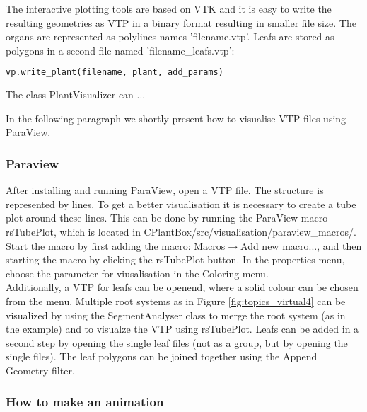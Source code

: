The interactive plotting tools are based on VTK and it is easy to write the resulting geometries as VTP in a binary format resulting in smaller file size. The organs are represented as polylines names 'filename.vtp'. Leafs are stored as polygons in a second file named 'filename\_leafs.vtp':
\begin{lstlisting}[language=Python]
vp.write_plant(filename, plant, add_params)
\end{lstlisting}


The class PlantVisualizer can ...


In the following paragraph we shortly present how to visualise VTP files using \href{https://www.paraview.org/}{ParaView}.


\subsubsection*{Paraview}

After installing and running \href{https://www.paraview.org/}{ParaView}, open a VTP file. The structure is represented by lines. To get a better visualisation it is necessary to create a tube plot around these lines. This can be done by running the ParaView macro rsTubePlot, which is located in CPlantBox/src/visualisation/paraview\_macros/. Start the macro by first adding the macro: Macros$\rightarrow$Add new macro..., and then starting the macro by clicking the rsTubePlot button. In the properties menu, choose the parameter for viusalisation in the Coloring menu.\\

Additionally, a VTP for leafs can be openend, where a solid colour can be chosen from the menu. Multiple root systems as in Figure \ref{fig:topics_virtual4} can be visualized by using the SegmentAnalyser class to merge the root system (as in the example) and to visualze the 
VTP using rsTubePlot. Leafs can be added in a second step by opening the single leaf files (not as a group, but by opening the single files). The leaf polygons can be joined together using the Append Geometry filter.

\subsubsection*{How to make an animation} \label{ssec:animation}

